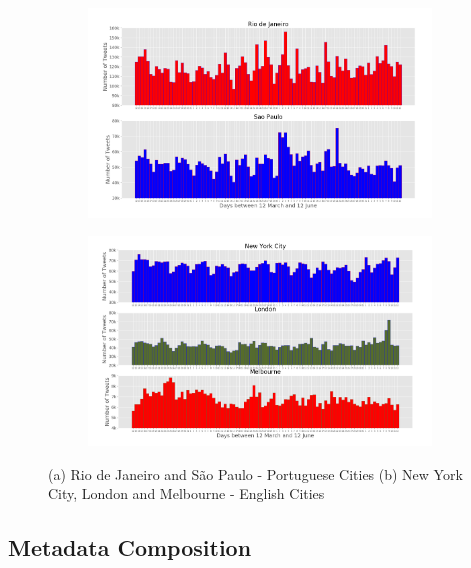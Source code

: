 \begin{figure}[htbp]
\centering
   \begin{subfigure}[t]{\textwidth}
   \includegraphics[width=\linewidth]{figures/rio_sp_whole_months.png}
   \caption{}
   \label{fig:portuguese_cities_whole_months} 
	\end{subfigure}

	\begin{subfigure}[t]{\textwidth}
    \includegraphics[width=\linewidth]{figures/nyc_london_melbourne_whole_months.png}
    \caption{}
    \label{fig:english_cities_whole_months}
	\end{subfigure}

\caption[Two numerical solutions]{(a) Rio de Janeiro and São Paulo - Portuguese Cities (b) New York City, London and Melbourne - English Cities}
\end{figure}

\subsection{Metadata Composition}

